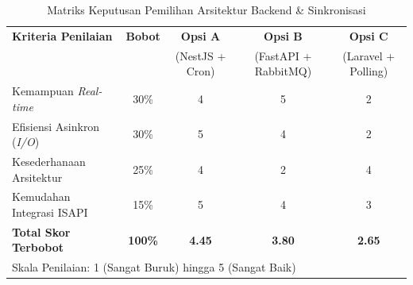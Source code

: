 \begin{table}[H]
    \centering
    \caption{Matriks Keputusan Pemilihan Arsitektur Backend \& Sinkronisasi}
    \label{tab:matriks_keputusan_arsitektur}
    \begin{tabular}{|l|c|c|c|c|}
        \hline
        \textbf{Kriteria Penilaian} & \textbf{Bobot} & \textbf{Opsi A} & \textbf{Opsi B} & \textbf{Opsi C} \\
        & & (NestJS + Cron) & (FastAPI + RabbitMQ) & (Laravel + Polling) \\
        \hline
        Kemampuan \textit{Real-time} & 30\% & 4 & 5 & 2 \\
        \hline
        Efisiensi Asinkron (\textit{I/O}) & 30\% & 5 & 4 & 2 \\
        \hline
        Kesederhanaan Arsitektur & 25\% & 4 & 2 & 4 \\
        \hline
        Kemudahan Integrasi ISAPI & 15\% & 5 & 4 & 3 \\
        \hline
        \textbf{Total Skor Terbobot} & \textbf{100\%} & \textbf{4.45} & \textbf{3.80} & \textbf{2.65} \\
        \hline
        \multicolumn{5}{l}{\small *Skala Penilaian: 1 (Sangat Buruk) hingga 5 (Sangat Baik)} \\
    \end{tabular}
\end{table}